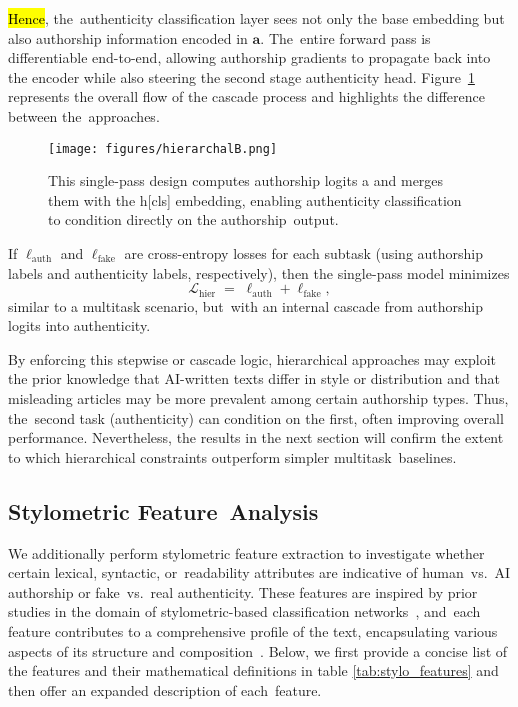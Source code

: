 \documentclass[electronics,article,accept,pdftex,moreauthors,electronics]{Definitions/mdpi}
\begin{document}
\hl{Hence}, the~authenticity classification layer sees not only the base embedding but also authorship 
information encoded in $\mathbf{a}$. The~entire forward pass is differentiable end-to-end, 
allowing authorship gradients to propagate back into the encoder while also steering the second 
stage authenticity head. Figure~\ref{fig9} represents the overall flow of the cascade process and highlights the difference between the~approaches.

\begin{figure}[H] %
    \texttt{[image: figures/hierarchalB.png]}
    \caption{This single-pass design computes authorship logits a and merges them with the h[cls] embedding, enabling authenticity classification to condition directly on the authorship~output.}
    \label{fig9}
\end{figure}


If $\ell_\mathrm{auth}$ and $\ell_\mathrm{fake}$ are cross-entropy losses for each subtask 
(using authorship labels and authenticity labels, respectively), then the single-pass model 
minimizes
\begin{equation}
\label{eq:hier_loss}
\mathcal{L}_\text{hier} \;=\; \ell_\mathrm{auth} + \ell_\mathrm{fake},
\end{equation}
similar to a multitask scenario, but~with an internal cascade from authorship 
logits into authenticity.


By enforcing this stepwise or cascade logic, hierarchical approaches may exploit the 
prior knowledge that AI-written texts differ in style or distribution and that 
misleading articles may be more prevalent among certain authorship types. Thus, the~second 
task (authenticity) can condition on the first, often improving overall performance. 
Nevertheless, the results in the next section will confirm 
the extent to which hierarchical constraints outperform simpler multitask~baselines.


\subsection{Stylometric Feature~Analysis}
\label{sec:stylometric_analysis}

We additionally perform stylometric feature extraction to investigate whether certain lexical, syntactic, or~readability attributes are indicative of human~vs.~AI authorship or fake~vs.~real authenticity. These features are inspired by prior studies in the domain of stylometric-based classification networks~\cite{opara2024styloai}, and~each feature contributes to a comprehensive profile of the text, encapsulating various aspects of its structure and composition~\cite{kumarage2023stylometric}. Below, we first provide a concise list of the features and their mathematical definitions in table \ref{tab:stylo_features} and then offer an expanded description of each~feature.
\end{document}
